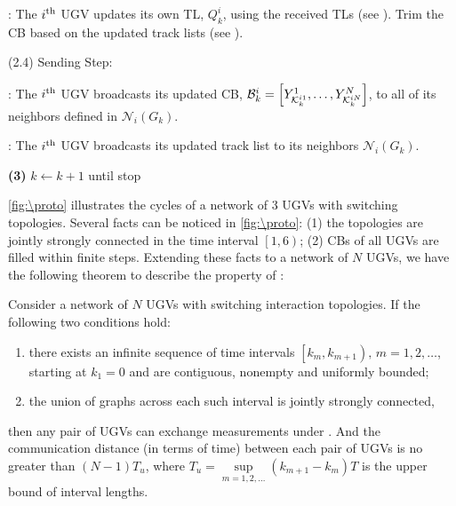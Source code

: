 \begin{algorithm}
\begin{algorithmic}
			\TL: The $i^\text{th}$ UGV updates its own TL, $Q^i_k$, using the received TLs (see ).
			Trim the CB based on the updated track lists (see ). 
			
			\State (2.4) Sending Step:
			
			\CB: The $i^\text{th}$ UGV broadcasts its updated CB, \small$\mathcal{B}^i_k=\left[Y^1_{\mathcal{K}^{i1}_{k}},\dots,Y^N_{\mathcal{K}^{iN}_{k}}\right]$\normalsize, to all of its neighbors defined in $\mathcal{N}_i(G_k)$.
			
			\TL: The $i^\text{th}$ UGV broadcasts its updated track list to its neighbors $\mathcal{N}_i(G_k)$.
			
			\State \textbf{(3)} $k\leftarrow k+1$ until stop
		\end{algorithmic}
	\end{algorithm}
	
	\cref{fig:\proto} illustrates the {\proto} cycles of a network of 3 UGVs with switching topologies.
	Several facts can be noticed in \cref{fig:\proto}: 
	(1) the topologies are jointly strongly connected in the time interval $\left[1,6\right)$;
	(2) CBs of all UGVs are filled within finite steps.
	Extending these facts to a network of $N$ UGVs, we have the following theorem to describe the property of \proto:
	
	\begin{thm}\label{prop1}
		Consider a network of $N$ UGVs with switching interaction topologies.
		If the following two conditions hold:
		\begin{enumerate}
			\item there exists an infinite sequence of time intervals $\left[k_m,k_{m+1} \right),\,m=1,2,\dots$, starting at $k_1=0$ and are contiguous, nonempty and uniformly bounded;
			\item the union of graphs across each such interval is jointly strongly connected,
		\end{enumerate}
		then any pair of UGVs can exchange measurements under \proto. And the communication distance (in terms of time) between each pair of UGVs is no greater than \small$(N-1)T_u$\normalsize, where \small$T_u=\sup\limits_{m=1,2,\dots}\left( k_{m+1}-k_m\right) T$ \normalsize is the upper bound of interval lengths.
	\end{thm}
	
